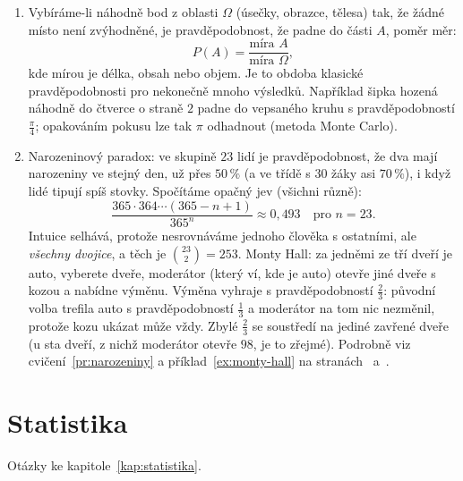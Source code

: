 \begin{enumerate}[label=\textbf{\arabic*.}, leftmargin=*, itemsep=0.8em]
  \item {}
  Vybíráme-li náhodně bod z oblasti $\Omega$ (úsečky, obrazce, tělesa) tak, že žádné místo není zvýhodněné, je pravděpodobnost, že padne do části $A$, poměr měr:
  \begin{equation*}
    P(A) = \frac{\text{míra } A}{\text{míra } \Omega},
  \end{equation*}
  kde mírou je délka, obsah nebo objem. Je to obdoba klasické pravděpodobnosti pro nekonečně mnoho výsledků. Například šipka hozená náhodně do čtverce o straně $2$ padne do vepsaného kruhu s pravděpodobností $\frac{\pi}{4}$; opakováním pokusu lze tak $\pi$ odhadnout (metoda Monte Carlo). 

  \item {}
  Narozeninový paradox: ve skupině $23$ lidí je pravděpodobnost, že dva mají narozeniny ve stejný den, už přes $50\,\%$ (a ve třídě s $30$ žáky asi $70\,\%$), i když lidé tipují spíš stovky. Spočítáme opačný jev (všichni různě):
  \begin{equation*}
    \frac{365\cdot 364\cdots(365 - n + 1)}{365^n}\approx 0{,}493\quad\text{pro } n = 23.
  \end{equation*}
  Intuice selhává, protože nesrovnáváme jednoho člověka s ostatními, ale \emph{všechny dvojice}, a těch je $\binom{23}{2} = 253$. Monty Hall: za jedněmi ze tří dveří je auto, vyberete dveře, moderátor (který ví, kde je auto) otevře jiné dveře s kozou a nabídne výměnu. Výměna vyhraje s pravděpodobností $\frac{2}{3}$: původní volba trefila auto s pravděpodobností $\frac{1}{3}$ a moderátor na tom nic nezměnil, protože kozu ukázat může vždy. Zbylé $\frac{2}{3}$ se soustředí na jediné zavřené dveře (u sta dveří, z nichž moderátor otevře $98$, je to zřejmé). Podrobně viz cvičení~\ref{pr:narozeniny} a příklad~\ref{ex:monty-hall} na stranách~\pageref{pr:narozeniny} a~\pageref{ex:monty-hall}.
\end{enumerate}

\section{Statistika}

Otázky ke kapitole~\ref{kap:statistika}.

